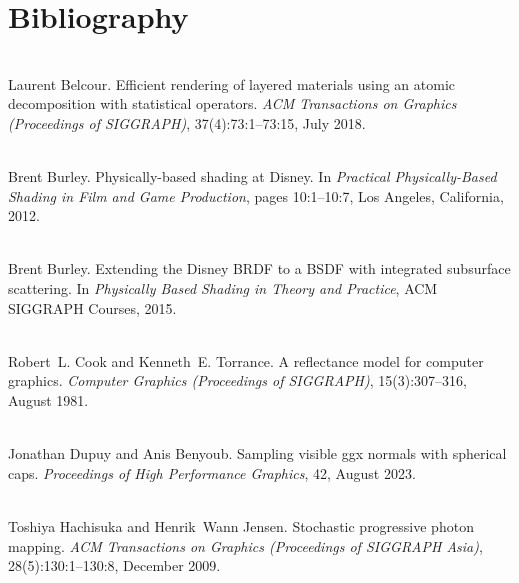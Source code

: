 \chapter{Bibliography}
\hypertarget{citelist}{}\label{citelist}

\begin{DoxyDescription}
\item[\label{citelist_CITEREF_Belcour:2018:Efficient}%
\Hypertarget{citelist_CITEREF_Belcour:2018:Efficient}%
\mbox{[}1\mbox{]}]\hfill \\
Laurent Belcour. Efficient rendering of layered materials using an atomic decomposition with statistical operators. {\itshape ACM Transactions on Graphics (Proceedings of SIGGRAPH)}, 37(4)\+:73\+:1--73\+:15, July 2018. 


\item[\label{citelist_CITEREF_Burley:2012:Physicallybased}%
\Hypertarget{citelist_CITEREF_Burley:2012:Physicallybased}%
\mbox{[}2\mbox{]}]\hfill \\
Brent Burley. Physically-\/based shading at Disney. In {\itshape Practical Physically-\/\+Based Shading in Film and Game Production}, pages 10\+:1--10\+:7, Los Angeles, California, 2012.


\item[\label{citelist_CITEREF_Burley:2015:Extending}%
\Hypertarget{citelist_CITEREF_Burley:2015:Extending}%
\mbox{[}3\mbox{]}]\hfill \\
Brent Burley. Extending the Disney BRDF to a BSDF with integrated subsurface scattering. In {\itshape Physically Based Shading in Theory and Practice}, ACM SIGGRAPH Courses, 2015.


\item[\label{citelist_CITEREF_Cook:1981:Reflectance}%
\Hypertarget{citelist_CITEREF_Cook:1981:Reflectance}%
\mbox{[}4\mbox{]}]\hfill \\
Robert~L. Cook and Kenneth~E. Torrance. A reflectance model for computer graphics. {\itshape Computer Graphics (Proceedings of SIGGRAPH)}, 15(3)\+:307--316, August 1981. 


\item[\label{citelist_CITEREF_Dupuy:2023:Sampling}%
\Hypertarget{citelist_CITEREF_Dupuy:2023:Sampling}%
\mbox{[}5\mbox{]}]\hfill \\
Jonathan Dupuy and Anis Benyoub. Sampling visible ggx normals with spherical caps. {\itshape Proceedings of High Performance Graphics}, 42, August 2023. 


\item[\label{citelist_CITEREF_Hachisuka:2009:Stochastic}%
\Hypertarget{citelist_CITEREF_Hachisuka:2009:Stochastic}%
\mbox{[}6\mbox{]}]\hfill \\
Toshiya Hachisuka and Henrik~Wann Jensen. Stochastic progressive photon mapping. {\itshape ACM Transactions on Graphics (Proceedings of SIGGRAPH Asia)}, 28(5)\+:130\+:1--130\+:8, December 2009. 



\end{DoxyDescription}
